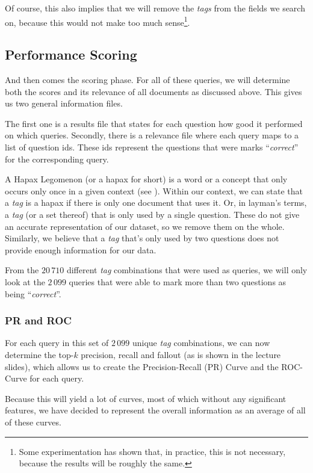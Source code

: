 \documentclass[11pt]{article}
\begin{document}
Of course, this also implies that we will remove the \textit{tags} from the fields we search on, because this would not make too much sense\footnote{Some experimentation has shown that, in practice, this is not necessary, because the results will be roughly the same.}.

\subsection{Performance Scoring}
And then comes the scoring phase. For all of these queries, we will determine both the scores and its relevance of all documents as discussed above. This gives us two general information files.

The first one is a results file that states for each question how good it performed on which queries. Secondly, there is a relevance file where each query maps to a list of question ids. These ids represent the questions that were marks ``\textit{correct}'' for the corresponding query.

A \textsf{Hapax Legomenon} (or a \textsf{hapax} for short) is a word or a concept that only occurs only once in a given context (see \cite{hapax}). Within our context, we can state that a \textit{tag} is a \textsf{hapax} if there is only one document that uses it. Or, in layman's terms, a \textit{tag} (or a set thereof) that is only used by a single question. These do not give an accurate representation of our dataset, so we remove them on the whole. Similarly, we believe that a \textit{tag} that's only used by two questions does not provide enough information for our data.

From the $20\,710$ different \textit{tag} combinations that were used as queries, we will only look at the $2\,099$ queries that were able to mark more than two questions as being ``\textit{correct}''.

\subsubsection{PR and ROC}
For each query in this set of $2\,099$ unique \textit{tag} combinations, we can now determine the top-$k$ precision, recall and fallout (as is shown in the lecture slides), which allows us to create the Precision-Recall (PR) Curve and the ROC-Curve for each query.

Because this will yield a lot of curves, most of which without any significant features, we have decided to represent the overall information as an average of all of these curves.
\end{document}
